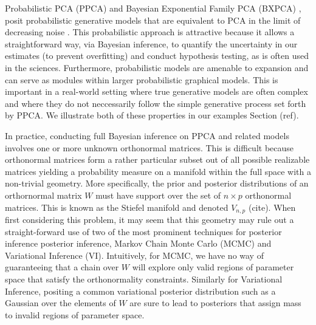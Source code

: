 \documentclass{article}
\begin{document}
Probabilistic PCA (PPCA) \citep{tipping1999probabilistic} and Bayesian Exponential Family PCA (BXPCA) \citep{mohamed2009bayesian}, posit probabilistic generative models that are equivalent to PCA in the limit of decreasing noise \citep[chapt.~12.2]{murphy2012machine}. This probabilistic approach is attractive because it allows a straightforward way, via Bayesian inference, to quantify the uncertainty in our estimates (to prevent overfitting) and conduct hypothesis testing, as is often used in the sciences. Furthermore, probabilistic models are amenable to expansion and can serve as modules within larger probabilistic graphical models.  This is important in a real-world setting where true generative models are often complex and where they do not neccessarily follow the simple generative process set forth by PPCA. We illustrate both of these properties in our examples Section (ref).

In practice, conducting full Bayesian inference on PPCA and related models involves one or more unknown orthonormal matrices.  This is difficult because orthonormal matrices form a rather particular subset out of all possible realizable matrices yielding a probability measure on a manifold within the full space with a non-trivial geometry.  More specifically, the prior and posterior distributions of an orthornormal matrix $W$ must have support over the set of $n \times p$ orthonormal matrices.  This is known as the Stiefel manifold and denoted $V_{n,p}$ (cite).  When first considering this problem, it may seem that this geometry may rule out a straight-forward use of two of the most prominent techniques for posterior inference posterior inference, Markov Chain Monte Carlo (MCMC) and Variational Inference (VI).  Intuitively, for MCMC, we have no way of guaranteeing that a chain over $W$ will explore only valid regions of parameter space that satisfy the orthonormality constraints. Similarly for Variational Inference, positing a common variational posterior distribution such as a Gaussian over the elements of $W$ are sure to lead to posteriors that assign mass to invalid regions of parameter space.
\end{document}
